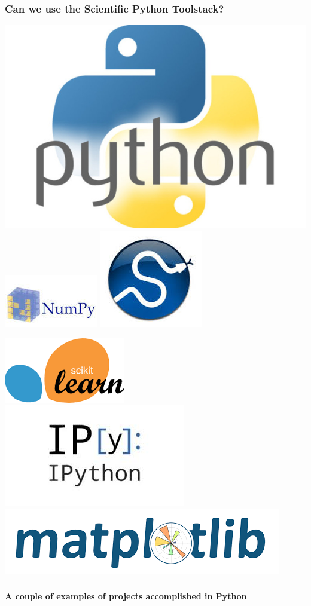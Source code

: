 \documentclass[xcolor=dvipsnames]{beamer}
\begin{document}
\begin{frame}
\frametitle{Can we use the Scientific Python Toolstack?}

\begin{center}
\includegraphics[width=0.2\linewidth]{images/pythonlogo.jpg} \hspace{3em}
\includegraphics[width=0.2\linewidth]{images/numpy.jpg}\hspace{3em}
\includegraphics[width=0.2\linewidth]{images/scipy.jpg}
\end{center}

\vspace{1.5em}

\begin{center}
\hspace{3em}
\includegraphics[width=0.2\linewidth]{images/scikit-learn.png}\hspace{3em}
\includegraphics[width=0.2\linewidth]{images/ipython.jpg}\hspace{3em}
\includegraphics[width=0.2\linewidth]{images/matplotlib.png}
\end{center}
\end{frame}

\begin{frame}
\frametitle{}
{\Large \bf A couple of examples of projects accomplished in Python}
\end{frame}
\end{document}
